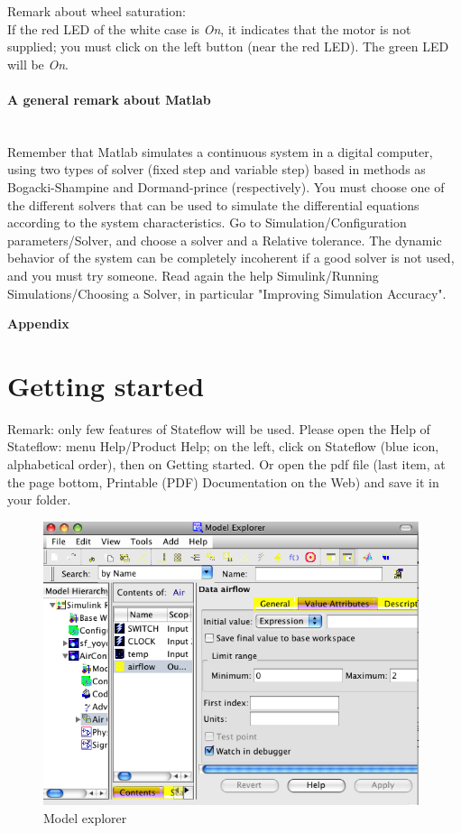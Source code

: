 \documentclass[a4paper]{article}
\begin{document}
Remark about wheel saturation:\\
If the red LED of the white case is \emph{On}, it indicates that the motor is not supplied;
you must click on the left button (near the red LED). The green LED will be \emph{On}.

\vspace{.5cm}
\paragraph{A general remark about Matlab}~\\
Remember that Matlab simulates a continuous system in a digital computer, using two types of solver
(fixed step and variable step) based in methods as Bogacki-Shampine and Dormand-prince
(respectively). You must choose one of the different  solvers that can be used to simulate the
differential equations according to the system characteristics. Go to Simulation/Configuration
parameters/Solver, and choose a solver and a  Relative tolerance. The dynamic behavior of the
system can be completely incoherent if a good solver is not used, and you must try someone.
Read again the help Simulink/Running Simulations/Choosing a Solver, in particular "Improving 
Simulation Accuracy".

\newpage

\appendix
\noindent
{\Large \bf Appendix}
\section{Getting started}
\label{getStart}
Remark: only few features of Stateflow will be used. Please open the Help of Stateflow: 
menu Help/Product Help; on the left, click on Stateflow (blue icon, alphabetical order), 
then on Getting started. Or open the pdf file (last item, at the page bottom, 
Printable (PDF) Documentation on the Web) and save it in your folder.

\begin{figure}[!ht]
\includegraphics[width=11cm]{modelExpl}
\caption{Model explorer}
\label{model}
\end{figure}
\end{document}
